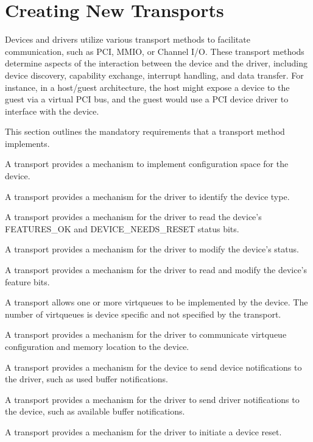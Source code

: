 \chapter{Creating New Transports}\label{sec:Creating New Transports}

Devices and drivers utilize various transport methods to facilitate
communication, such as PCI, MMIO, or Channel I/O. These transport
methods determine aspects of the interaction between the device and the
driver, including device discovery, capability exchange, interrupt
handling, and data transfer. For instance, in a host/guest architecture,
the host might expose a device to the guest via a virtual PCI bus, and
the guest would use a PCI device driver to interface with the device.

This section outlines the mandatory requirements that a transport method
implements.

A transport provides a mechanism to implement configuration space for
the device.

A transport provides a mechanism for the driver to identify the device
type.

A transport provides a mechanism for the driver to read the device's
FEATURES_OK and DEVICE_NEEDS_RESET status bits.

A transport provides a mechanism for the driver to modify the device's
status.

A transport provides a mechanism for the driver to read and modify the
device's feature bits.

A transport allows one or more virtqueues to be implemented by the
device. The number of virtqueues is device specific and not specified by
the transport.

A transport provides a mechanism for the driver to communicate virtqueue
configuration and memory location to the device.

A transport provides a mechanism for the device to send device
notifications to the driver, such as used buffer notifications.

A transport provides a mechanism for the driver to send driver
notifications to the device, such as available buffer notifications.

A transport provides a mechanism for the driver to initiate a device
reset.
